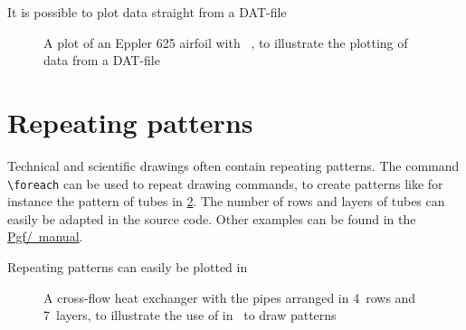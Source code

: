 \begin{frame}{It is possible to plot data straight from a DAT-file}
	\begin{figure}[b]\centering
		\caption{A plot of an Eppler 625 airfoil with \TikZ\ \parencite[data from][]{airfoils}, to illustrate the plotting of data from a DAT-file}\label{fig:airfoil}
	\end{figure}
\end{frame}

\section{Repeating patterns}
Technical and scientific drawings often contain repeating patterns. The command \texttt{\textbackslash foreach} can be used to repeat drawing commands, to create patterns like for instance the pattern of tubes in \cref{fig:pattern}. The number of rows and layers of tubes can easily be adapted in the source code. Other examples can be found in the \href{https://tikz.dev/pgffor}{Pgf/\TikZ\ manual}.

\begin{frame}{Repeating patterns can easily be plotted in \TikZ}
	\begin{figure}\centering
        \def\hxwidth{8cm}      %
        \def\hxheight{6cm}     %
        \def\nrrows{4}         %
        \def\nrlayers{7}       %
		\caption{A cross-flow heat exchanger with the pipes arranged in \nrrows\ rows and \nrlayers\ layers, to illustrate the use of  in \TikZ\ to draw patterns}\label{fig:pattern}
	\end{figure}
\end{frame}

